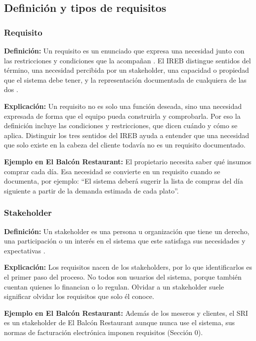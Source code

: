 \subsection{Definición y tipos de requisitos}
\subsubsection{Requisito}

\textbf{Definición:} Un requisito es un enunciado que expresa una necesidad junto con las restricciones y condiciones que la acompañan \cite[\nopp cl.~3.1.19]{ieee29148}. El IREB distingue sentidos del término, una necesidad percibida por un stakeholder, una capacidad o propiedad que el sistema debe tener, y la representación documentada de cualquiera de las dos \cite{ireb31}.

\textbf{Explicación:} Un requisito no es solo una función deseada, sino una necesidad expresada de forma que el equipo pueda construirla y comprobarla. Por eso la definición incluye las condiciones y restricciones, que dicen cuándo y cómo se aplica. Distinguir los tres sentidos del IREB ayuda a entender que una necesidad que solo existe en la cabeza del cliente todavía no es un requisito documentado.

\textbf{Ejemplo en El Balcón Restaurant:} El propietario necesita saber qué insumos comprar cada día. Esa necesidad se convierte en un requisito cuando se documenta, por ejemplo: “El sistema deberá sugerir la lista de compras del día siguiente a partir de la demanda estimada de cada plato”.

\subsubsection{Stakeholder}

\textbf{Definición:} Un stakeholder es una persona u organización que tiene un derecho, una participación o un interés en el sistema que este satisfaga sus necesidades y expectativas \cite[\nopp cl.~3.1.28]{ieee29148}.

\textbf{Explicación:} Los requisitos nacen de los stakeholders, por lo que identificarlos es el primer paso del proceso. No todos son usuarios del sistema, porque también cuentan quienes lo financian o lo regulan. Olvidar a un stakeholder suele significar olvidar los requisitos que solo él conoce.

\textbf{Ejemplo en El Balcón Restaurant:} Además de los meseros y clientes, el SRI es un stakeholder de El Balcón Restaurant aunque nunca use el sistema, sus normas de facturación electrónica imponen requisitos (Sección 0).

